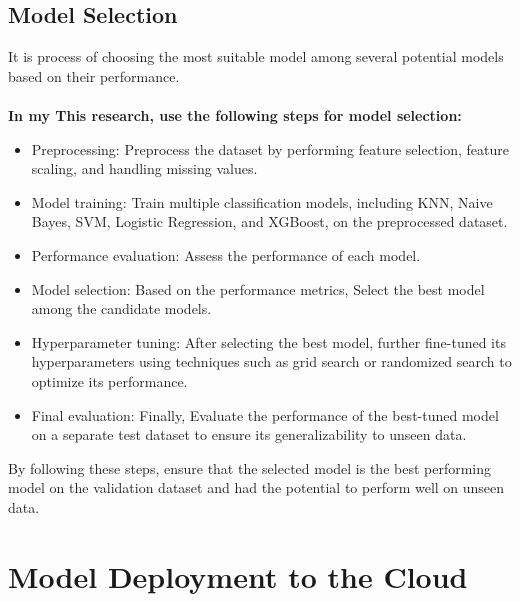 \subsection{Model Selection}
It is process of choosing the most suitable model among several potential models based on 
their performance.\\\\
\textbf{In my This research, use the following steps for model selection:}
\begin{itemize}
    \item Preprocessing: Preprocess the dataset by performing feature selection, feature scaling, and handling 
    missing values.
    \item Model training: Train multiple classification models, including KNN, Naive Bayes, SVM, Logistic 
    Regression, and XGBoost, on the preprocessed dataset.
    \item Performance evaluation: Assess the performance of each model.
    \item Model selection: Based on the performance metrics, Select the best model among the candidate models.
    \item Hyperparameter tuning: After selecting the best model, further fine-tuned its hyperparameters using 
    techniques such as grid search or randomized search to optimize its performance.
    \item Final evaluation: Finally, Evaluate the performance of the best-tuned model on a separate test dataset 
    to ensure its generalizability to unseen data.\\
\end{itemize}
By following these steps, ensure that the selected model is the best performing model on the validation 
dataset and had the potential to perform well on unseen data.

\section{Model Deployment to the Cloud}

